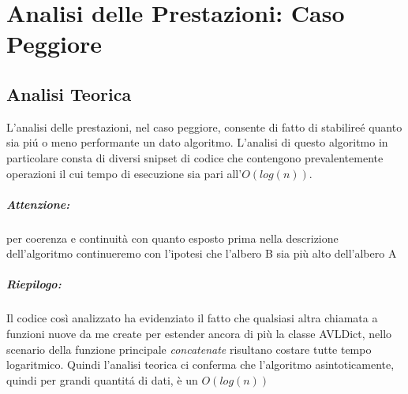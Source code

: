 \chapter{Analisi delle Prestazioni: Caso Peggiore}%
\section{Analisi Teorica}
L'analisi delle prestazioni, nel caso peggiore, consente di fatto di stabilire\'e quanto sia pi\'u o meno performante un dato algoritmo. L'analisi di questo algoritmo in particolare consta di diversi snipset di codice che contengono prevalentemente operazioni il cui tempo di esecuzione sia pari all'$O(log(n))$.
\newline
\newline


\newline 

\paragraph{Attenzione:} per coerenza e continuità con quanto esposto prima nella descrizione dell'algoritmo continueremo con l'ipotesi che l'albero B sia più alto dell'albero A \newline\newline









\paragraph{Riepilogo:}
Il codice così analizzato ha evidenziato il fatto che qualsiasi altra chiamata a funzioni nuove da me create per estender ancora di più la classe AVLDict, nello scenario della funzione principale \emph{concatenate} risultano costare tutte tempo logaritmico. Quindi l'analisi teorica ci conferma che l'algoritmo asintoticamente, quindi per grandi quantit\'a di dati, è un $O(log(n))$

